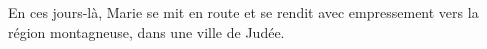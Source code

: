 En ces jours-là, Marie se mit en route
	et se rendit avec empressement vers la région montagneuse,
	dans une ville de Judée.
